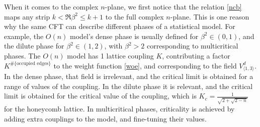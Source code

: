 \documentclass[12pt, a4paper]{article}
\begin{document}
When it comes to the complex $n$-plane, we first notice that the relation \eqref{ncb} maps any strip $k<\Re \beta^2\leq k+1$ to the full complex $n$-plane. 
This is one reason why the same CFT can describe different phases of a statistical model. For example, the $O(n)$ model's dense phase is usually defined for $\beta^2\in (0,1)$, and the dilute phase for $\beta^2\in (1,2)$, with $\beta^2>2$ corresponding to multicritical phases. The $O(n)$ model has 1 lattice coupling $K$, contributing a factor $K^{\#\{\text{occupied edges}\}}$ to the weight function \eqref{woe}, and corresponding to the field $V^d_{\langle 1,3\rangle}$. In the dense phase, that field is irrelevant, and the critical limit is obtained for a range of values of the coupling. In the dilute phase it is relevant, and the critical limit is obtained for the critical value of the coupling, which is $K_c = \frac{1}{\sqrt{2+\sqrt{2-n}}}$ for the honeycomb lattice. In multicritical phases, criticality is achieved by adding extra couplings to the model, and fine-tuning their values.
\end{document}
